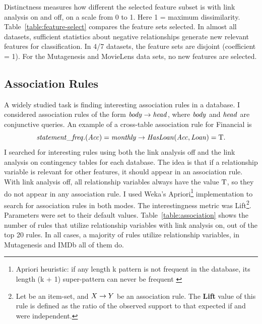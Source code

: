 \documentclass{sfuthesis}
\begin{document}
Distinctness measures how different the selected feature subset is with link analysis on and off, on a scale from 0 to 1. Here 1 = maximum dissimilarity. Table~\ref{table:feature-select} compares the feature sets selected. In almost all datasets, sufficient statistics about negative relationships generate new relevant features for classification. %
In 4/7 datasets, the feature sets are disjoint (coefficient = 1). For the Mutagenesis and MovieLens data sets, no new features are selected. 


\subsection{Association Rules} A widely studied task is finding interesting association rules in a database. I  considered association rules of the form $\it{body} \rightarrow \it{head}$, where $\it{body}$ and $\it{head}$ are conjunctive queries. An example of a cross-table association rule for Financial is 
%
$$\it{statement\_freq.(Acc)} = \it{monthly} \rightarrow \it{HasLoan}(\it{Acc},\it{Loan}) = \mathrm{T}.$$
I  searched for interesting rules using both the link analysis off and the link analysis on contingency tables for each database. The idea is that if a relationship variable is relevant for other features, it should appear in an association rule. With link analysis off, all relationship variables always have the value $\mathrm{T}$, so they do not appear in any association rule. I  used Weka's Apriori\footnote{Apriori heuristic: if any length k pattern is not frequent in the database, its length (k + 1) super-pattern can never be frequent \cite{Agrawal1994}} implementation to search for association rules in both modes. The interestingness metric was Lift\footnote{Let {\X} be an item-set,  and ${X} \rightarrow {Y}$ be an association rule. The \textbf{Lift} value of this rule is defined as  the ratio of the observed support to that expected if {\X}  and {\Y}  were independent. }. Parameters were set to their default values. Table~\ref{table:association} shows the number of rules that utilize relationship variables with link analysis on, out of the top 20 rules. In all cases, a majority of rules utilize relationship variables,  in Mutagenesis and IMDb all of them do. %
%
\begin{table}[h] \centering
\caption{Number of top 20 Association Rules that utilize relationship variables.}
  \label{table:association}%

\end{table}%
\end{document}
